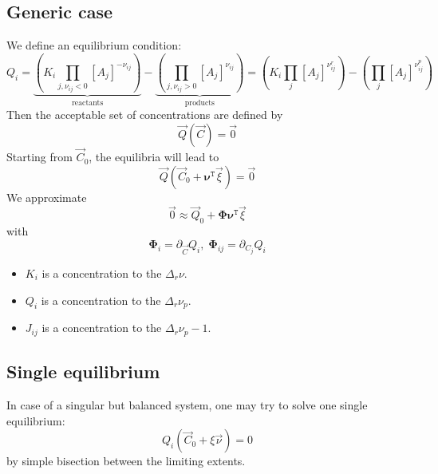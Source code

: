 \documentclass[aps,12pt]{revtex4}
\newcommand{\trn}[1]{{#1}^{\mathtt{T}}}
\newcommand{\conc}[1]{{\left[#1\right]}}
\begin{document}
\subsection{Generic case}
We define an equilibrium condition:
\begin{equation}
	Q_i =  \underbrace{\left(K_i \prod_{j,\nu_{ij}<0} \conc{A_j}^{-\nu_{ij}}\right)}_{\text{reactants}} 
	- \underbrace{\left( \prod_{j,\nu_{ij}>0} \conc{A_j}^{\nu_{ij}}\right)}_{\text{products}}
	= \left(K_i \prod_{j} \conc{A_j}^{\nu^r_{ij}}\right)
	- \left( \prod_{j} \conc{A_j}^{\nu^p_{ij}}\right)  
\end{equation}
Then the acceptable set of concentrations are defined by
\begin{equation}
	\vec{Q}(\vec{C}) = \vec{0}
\end{equation}
Starting from $\vec{C}_0$, the equilibria will lead to
\begin{equation}
	\vec{Q}(\vec{C}_0+\trn{\bm{\nu}} \vec{\xi}) = \vec{0}
\end{equation}
We approximate
\begin{equation}
	\vec{0} \approx \vec{Q}_0 + \bm{\Phi} \trn{\bm{\nu}} \vec{\xi}
\end{equation}
with
\begin{equation}
	\bm{\Phi}_i = \partial_{\vec{C}} Q_i,\; \bm{\Phi}_{ij}= \partial_{C_j} Q_i
\end{equation}

\begin{itemize}
\item $K_i$ is a concentration to the $\Delta_r \nu$.
\item $Q_i$ is a concentration to the $\Delta_r \nu_p$.
\item $J_{ij}$ is a concentration to the $\Delta_r \nu_p-1$.
\end{itemize}

\subsection{Single equilibrium}
In case of a singular but balanced system, one may try to solve one single equilibrium:
\begin{equation}
Q_i\left(\vec{C}_0 + \xi \vec{\nu}\right) = 0
\end{equation}
by simple bisection between the limiting extents.
\end{document}
